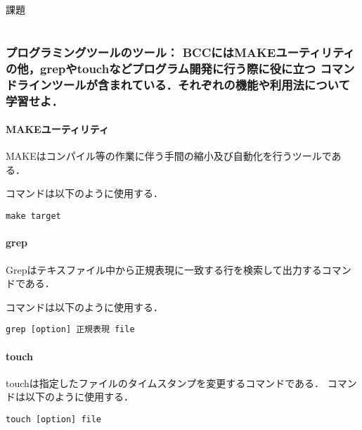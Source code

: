 \documentclass[a4paper, 10pt]{ltjsarticle}
\newcommand{\homework}{\part{}\setcounter{section}{0}}
\newcommand{\question}[1]{\section{#1}}
\newcommand{\subquestion}[1]{\subsection{#1}}
\begin{document}

\noindent\textsf{\LARGE 課題}


\homework


\question{
	\textsf{プログラミングツールのツール：}
	BCCにはMAKEユーティリティの他，grepやtouchなどプログラム開発に行う際に役に立つ
	コマンドラインツールが含まれている．それぞれの機能や利用法について学習せよ．\\
}

\vspace{-\baselineskip}


\subquestion{MAKEユーティリティ}

MAKEはコンパイル等の作業に伴う手間の縮小及び自動化を行うツールである．

コマンドは以下のように使用する．\cite{Make}

\begin{lstlisting}[tabsize=1, numberstyle=\color{white}]
	make target
\end{lstlisting}

\vspace{-\baselineskip}


\subquestion{grep}

Grepはテキスファイル中から正規表現に一致する行を検索して出力するコマンドである．

コマンドは以下のように使用する．\cite{Grep}

\begin{lstlisting}[tabsize=1, numberstyle=\color{white}]
	grep [option] 正規表現 file
\end{lstlisting}

\vspace{-\baselineskip}


\subquestion{touch}

touchは指定したファイルのタイムスタンプを変更するコマンドである．
コマンドは以下のように使用する．\cite{touch}

\begin{lstlisting}[tabsize=1, numberstyle=\color{white}]
	touch [option] file
\end{lstlisting}
\end{document}
